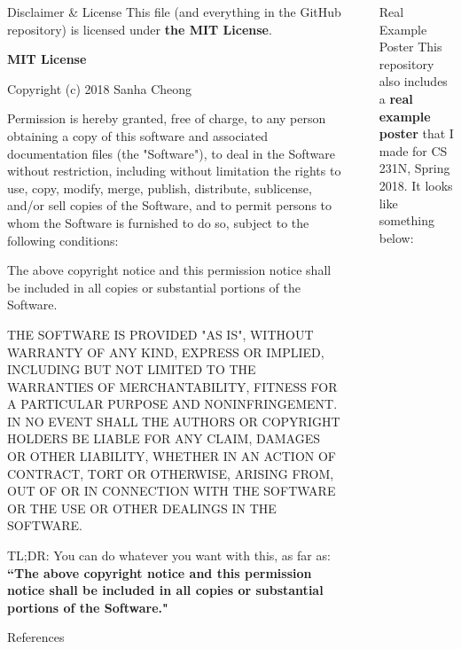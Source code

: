 \documentclass[final]{beamer}
\newlength{\sepwid}
\newlength{\thirdcolwid}
\newlength{\lastcolwid}
\newcommand{\emphg}[1]{{\color{paloalto}\textbf{#1}}}
\begin{document}
\begin{frame}[t]
\begin{columns}[t]
\begin{column}[t]{\thirdcolwid}
\begin{block}{Disclaimer \& License}
	    This file (and everything in the GitHub repository) is licensed under \emphg{the MIT License}.
	    
	    \begin{center}
	    	\textbf{MIT License}
	    	
	    	Copyright (c) 2018 Sanha Cheong
	    \end{center}
	    
	    Permission is hereby granted, free of charge, to any person obtaining a copy
	    of this software and associated documentation files (the "Software"), to deal
	    in the Software without restriction, including without limitation the rights
	    to use, copy, modify, merge, publish, distribute, sublicense, and/or sell
	    copies of the Software, and to permit persons to whom the Software is
	    furnished to do so, subject to the following conditions:
	    
	    The above copyright notice and this permission notice shall be included in all
	    copies or substantial portions of the Software.
	    
	    THE SOFTWARE IS PROVIDED "AS IS", WITHOUT WARRANTY OF ANY KIND, EXPRESS OR
	    IMPLIED, INCLUDING BUT NOT LIMITED TO THE WARRANTIES OF MERCHANTABILITY,
	    FITNESS FOR A PARTICULAR PURPOSE AND NONINFRINGEMENT. IN NO EVENT SHALL THE
	    AUTHORS OR COPYRIGHT HOLDERS BE LIABLE FOR ANY CLAIM, DAMAGES OR OTHER
	    LIABILITY, WHETHER IN AN ACTION OF CONTRACT, TORT OR OTHERWISE, ARISING FROM,
	    OUT OF OR IN CONNECTION WITH THE SOFTWARE OR THE USE OR OTHER DEALINGS IN THE
	    SOFTWARE.
	    
	    \vspace{1cm}
	    TL;DR: You can do whatever you want with this, as far as: \emphg{``The above copyright notice and this permission notice shall be included in all copies or substantial portions of the Software."}
	
	\end{block}
    
    \begin{block}{References}
		{\small
			
			
		}
	\end{block}
\end{column}

\begin{column}{\sepwid}\end{column}

\begin{column}{\lastcolwid}
	\begin{alertblock}{Real Example Poster}
        This repository also includes a \emphg{real example poster} that I made for CS 231N, Spring 2018. It looks like something below:
        

\end{alertblock}
\end{column}
\end{columns}
\end{frame}
\end{document}
